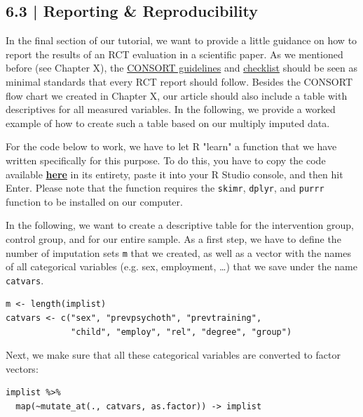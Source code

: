 \subsection{{\normalfont\textsf{\textcolor{sBlue}{\small 6.3 |}}} Reporting \& Reproducibility}

In the final section of our tutorial, we want to provide a little guidance on how to report the results of an RCT evaluation in a scientific paper. As we mentioned before (see Chapter X), the \href{https://www.consort-statement.org/}{CONSORT guidelines} and \href{https://www.consort-statement.org/download/Media/Default/Downloads/CONSORT%202010%20Checklist.doc}{checklist} should be seen as minimal standards that every RCT report should follow. Besides the CONSORT flow chart we created in Chapter X, our article should also include a table with descriptives for all measured variables. In the following, we provide a worked example of how to create such a table based on our multiply imputed data. 

For the code below to work, we have to let \textsf{R} "learn" a function that we have written specifically for this purpose. To do this, you have to copy the code available \href{https://raw.githubusercontent.com/MathiasHarrer/rct-tutorial/main/code/skimReport.R}{\textbf{here}} in its entirety, paste it into your R Studio console, and then hit Enter. Please note that the function requires the \texttt{skimr}, \texttt{dplyr}, and \texttt{purrr} function to be installed on our computer.  

In the following, we want to create a descriptive table for the intervention group, control group, and for our entire sample. As a first step, we have to define the number of imputation sets \texttt{m} that we created, as well as a vector with the names of all categorical variables (e.g. sex, employment, \dots) that we save under the name \texttt{catvars}.

\begin{lstlisting}
m <- length(implist)
catvars <- c("sex", "prevpsychoth", "prevtraining",
             "child", "employ", "rel", "degree", "group")
\end{lstlisting}

Next, we make sure that all these categorical variables are converted to factor vectors:

\begin{lstlisting}
implist %>%
  map(~mutate_at(., catvars, as.factor)) -> implist
\end{lstlisting}

